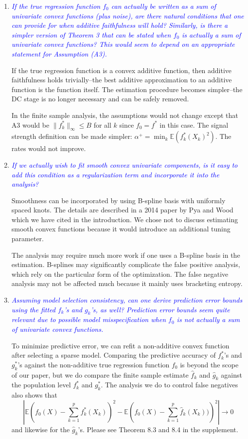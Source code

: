 \documentclass[pdftex,12pt]{article}
\let\hat\widehat
\def\rc#1{{\it\textcolor{blue}{#1}}\smallskip}
\begin{document}
\begin{enumerate}[(1)]
\item \rc{If the true regression function $f_0$ can actually be written as a
sum of univariate convex functions (plus noise), are there natural
conditions that one can provide for when additive faithfulness will
hold? Similarly, is there a simpler version of Theorem 3 that can be
stated when $f_0$ is actually a sum of univariate convex functions? This
would seem to depend on an appropriate statement for Assumption (A3).}

If the true regression function is a convex additive function, then additive faithfulness holds trivially--the best additive approximation to an additive function is the function itself. The estimation procedure becomes simpler--the DC stage is no longer necessary and can be safely removed. 

In the finite sample analysis, the assumptions would not change except that A3 would be $\| f^*_k \|_\infty \leq B$ for all $k$ since $f_0 = f^*$ in this case. The signal strength definition can be made simpler: $\alpha^+ = \min_k \mathbb{E}( f^*_k(X_k)^2 )$. The rates would not improve.


\item \rc{If we actually wish to fit smooth convex univariate components, is
it easy to add this condition as a regularization term and incorporate
it into the analysis?}

Smoothness can be incorporated by using B-spline basis with uniformly spaced knots. The details are described in a 2014 paper by Pya and Wood which we have cited in the introduction. We chose not to discuss estimating smooth convex functions because it would introduce an additional tuning parameter.

The analysis may require much more work if one uses a B-spline basis in the estimation. B-splines may significantly complicate the false positive analysis, which rely on the particular form of the optimization. The false negative analysis may not be affected much because it mainly uses bracketing entropy.

\item \rc{Assuming model selection consistency, can one derive prediction
error bounds using the fitted $f_k$'s and $g_k$'s, as well? Prediction error
bounds seem quite relevant due to possible model misspecification when
$f_0$ is not actually a sum of univariate convex functions.}

To minimize predictive error, we can refit a non-additive convex function after selecting a sparse model. Comparing the predictive accuracy of $f^*_k$'s and $g^*_k$'s against the non-additive true regression function $f_0$ is beyond the scope of our paper, but we do compare the finite sample estimate $\hat{f}_k$ and $\hat{g}_k$ against the population level $f^*_k$ and $g^*_k$. The analysis we do to control false negatives also shows that $$\left| \mathbb{E}\left( f_0(X)  - \sum_{k=1}^p f^*_k(X_k) \right)^2 - \mathbb{E} \left( f_0(X) - \sum_{k=1}^p \hat{f}_k(X_k))\right)^2 \right| \rightarrow 0$$ and likewise for the $\hat{g}_k$'s. Please see Theorem 8.3 and 8.4 in the supplement. 


\end{enumerate}
\end{document}
